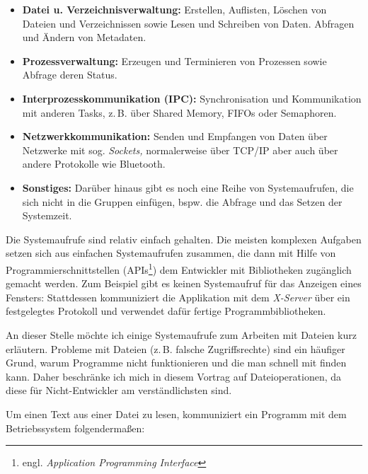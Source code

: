 \begin{itemize}
  \item \textbf{Datei u. Verzeichnisverwaltung:} Erstellen, Auflisten, Löschen von Dateien und 
    Verzeichnissen sowie Lesen und Schreiben von Daten. Abfragen und Ändern von Metadaten.
  \item \textbf{Prozessverwaltung:} Erzeugen und Terminieren von Prozessen sowie Abfrage deren 
   Status.
  \item \textbf{Interprozesskommunikation (IPC):} Synchronisation und Kommunikation mit anderen
    Tasks, z.\,B. über Shared Memory, FIFOs oder Semaphoren.
  \item \textbf{Netzwerkkommunikation:} Senden und Empfangen von Daten über Netzwerke mit sog.
   \emph{Sockets,} normalerweise über TCP/IP aber auch über andere Protokolle wie Bluetooth.
  \item \textbf{Sonstiges:} Darüber hinaus gibt es noch eine Reihe von Systemaufrufen, die sich
    nicht in die Gruppen einfügen, bspw. die Abfrage und das Setzen der Systemzeit.
\end{itemize}

Die Systemaufrufe sind relativ einfach gehalten. Die meisten komplexen Aufgaben setzen sich aus
einfachen Systemaufrufen zusammen, die dann mit Hilfe von Programmierschnittstellen (APIs\footnote{
engl. \emph{Application Programming Interface}}) dem Entwickler mit Bibliotheken zugänglich gemacht
werden. Zum Beispiel gibt es keinen Systemaufruf für das Anzeigen eines Fensters: Stattdessen
kommuniziert die Applikation mit dem \emph{X-Server} über ein festgelegtes Protokoll und verwendet
dafür fertige Programmbibliotheken.


An dieser Stelle möchte ich einige Systemaufrufe zum Arbeiten mit Dateien kurz erläutern. Probleme
mit Dateien (z.\,B. falsche Zugriffsrechte) sind ein häufiger Grund, warum Programme nicht
funktionieren und die man schnell mit \strace{} finden kann. Daher beschränke ich mich in diesem
Vortrag auf Dateioperationen, da diese für Nicht-Entwickler am verständlichsten sind.

Um einen Text aus einer Datei zu lesen, kommuniziert ein Programm mit dem Betriebssystem
folgendermaßen:

